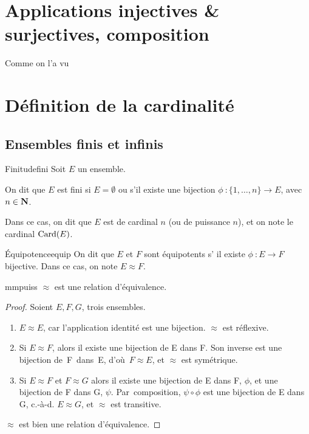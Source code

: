 \documentclass[a4paper,french,final]{memoir}
\begin{document}
 \chapter{Applications injectives \& surjectives, composition}
 Comme on l'a vu
 \chapter{Définition de la cardinalité}
\section{Ensembles finis et infinis}

\begin{defb}{Finitude}{fini}
     Soit $E$ un ensemble.

	On dit que $E$ est fini si $E = \emptyset$ ou s'il existe une bijection $\phi~: \{1,\dots,n \} \to E$, avec $n \in \mathbf{N}$.

	Dans ce cas, on dit que $E$ est de cardinal $n$ (ou de puissance $n$), et on note le cardinal $\operatorname{Card}(E)$.
\end{defb}


\begin{defb}{\'Equipotence}{equip}
    On dit que $E$ et $F$ sont équipotents s' il existe $\phi~: E \to F$ bijective. Dans ce cas, on note $E \mathrel{\approx} F$.
\end{defb}

\begin{theoremb}{}{mmpuiss}
    $ \mathrel{\approx}$ est une relation d'équivalence.
\end{theoremb}
\begin{proof}
    Soient $E, F, G$, trois ensembles.
	\begin{enumerate}
		\item $E \mathrel{\approx} E$, car l'application identité est une bijection. $\mathrel{\approx}$ est réflexive.
		\item Si $E \mathrel{\approx} F$, alors il existe une bijection de E dans F. Son inverse est une bijection de~F~dans~E, d'où~${F \mathrel{\approx} E}$, et $\mathrel{\approx}$ est symétrique.
		\item Si $E \mathrel{\approx} F$ et $F \mathrel{\approx} G$ alors il existe une bijection de E dans F, $\phi$, et une bijection de F dans G, $\psi$. Par~composition, $\psi\circ\phi$ est une bijection de E dans G, c.-à-d. $E \mathrel{\approx} G$, et  $\mathrel{\approx}$ est transitive.
	\end{enumerate}
	$\mathrel{\approx}$ est bien une relation d'équivalence.
\end{proof}
\end{document}
